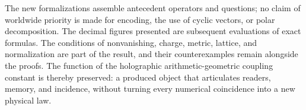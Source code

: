 The new formalizations assemble antecedent operators and questions; no claim of worldwide priority is made for encoding, the use of cyclic vectors, or polar decomposition. The decimal figures presented are subsequent evaluations of exact formulas. The conditions of nonvanishing, charge, metric, lattice, and normalization are part of the result, and their counterexamples remain alongside the proofs. The function of the holographic arithmetic-geometric coupling constant is thereby preserved: a produced object that articulates readers, memory, and incidence, without turning every numerical coincidence into a new physical law.
